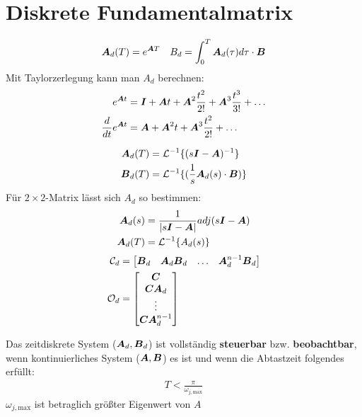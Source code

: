 \setcounter{section}{17}
\section{Diskrete Fundamentalmatrix}
\begin{tcolorbox}[colback=white!10!white,colframe=green!30!black,title=Definition] 
    \begin{align*}
        \boldsymbol{A}_d(T)= e^{\boldsymbol{A}T} && B_d = \int_{0}^{T}\boldsymbol{A}_d
        (\tau)d\tau    \cdot \boldsymbol{B} 
    \end{align*}
    Mit Taylorzerlegung kann man $A_d$ berechnen:
    \begin{align*}
        e^{\boldsymbol{A}t}  &= \boldsymbol{I} + \boldsymbol{A}t+\boldsymbol{A}^2\frac{t^2}{2!} + \boldsymbol{A}^3\frac{t^3}{3!}+ \ldots\\
        \frac{d}{dt}e^{\boldsymbol{A}t} &= \boldsymbol{A} + \boldsymbol{A}^2t+\boldsymbol{A}^3\frac{t^2}{2!} + \ldots
    \end{align*}
\end{tcolorbox}
\begin{tcolorbox}[colback=white!10!white,colframe=blue!30!black,title=KOCHREZEPT: Fundamentalmatrix Berechnung] 
    \begin{align*}
        \boldsymbol{A}_d(T) &= \mathcal{L}^{-1}\{(s\boldsymbol{I}-\boldsymbol{A})^{-1}\}\\
        \boldsymbol{B}_d(T) &= \mathcal{L}^{-1}\{(\frac{1}{s}\boldsymbol{A}_d(s)\cdot \boldsymbol{B})\}
    \end{align*}
    Für $2\times2$-Matrix lässt sich $A_d$ so bestimmen:
    \begin{align*}
        \boldsymbol{A}_d(s) &= \frac{1}{|s\boldsymbol{I}-\boldsymbol{A}|} adj(s\boldsymbol{I}-\boldsymbol{A})\\
        \boldsymbol{A}_d(T) &= \mathcal{L}^{-1}\{A_d(s)\}
    \end{align*}
    \tcblower
    \begin{align*}
        \mathcal{C}_d &= \begin{bmatrix}
        \boldsymbol{B}_d & \boldsymbol{A}_d\boldsymbol{B}_d & \ldots & \boldsymbol{A}_d^{n-1}\boldsymbol{B}_d
        \end{bmatrix}\\
        \mathcal{O}_d &= \begin{bmatrix}
        \boldsymbol{C} \\\boldsymbol{C}\boldsymbol{A}_d \\ \vdots \\ \boldsymbol{C}\boldsymbol{A}_d^{n-1}
        \end{bmatrix}
    \end{align*}
    \begin{tcolorbox}[colback=white!10!white,
                      colframe=gray!70!black,
                      title=Steuerbarkeit und Beobachtbarkeit]
        Das zeitdiskrete System ($\boldsymbol{A}_d,\boldsymbol{B}_d$) ist vollständig 
        \textbf{steuerbar} bzw. \textbf{beobachtbar}, wenn kontinuierliches 
        System ($\boldsymbol{A},\boldsymbol{B}$) es ist und wenn die Abtastzeit folgendes erfüllt:
        \begin{align*}
            T < \frac{\pi}{\omega_{j,\text{max}}}
        \end{align*}
        $\omega_{j,\text{max}}$ ist betraglich größter Eigenwert von $A$
    \end{tcolorbox}
\end{tcolorbox}
